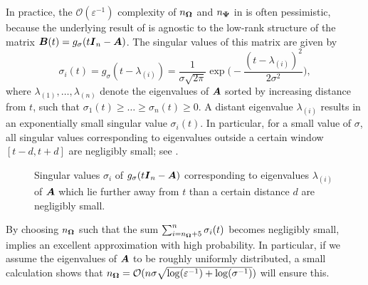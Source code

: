 In practice, the $\mathcal{O}(\varepsilon^{-1})$ complexity of $n_{\boldsymbol{\Omega}}$ and $n_{\boldsymbol{\Psi}}$ in  is often pessimistic, because  the underlying result of  is agnostic to the low-rank structure of the matrix $\boldsymbol{B}(t) = g_{\sigma}(t\boldsymbol{I}_n - \boldsymbol{A})$. The singular values of this matrix are given by
\begin{equation*}
    \sigma_i(t) = g_{\sigma}(t - \lambda_{(i)}) = \frac{1}{\sigma\sqrt{2 \pi}} \exp\Big( -\frac{(t - \lambda_{(i)})^2}{2 \sigma^2} \Big),  
    \label{equ:gaussian-kernel-eigenvalues}
\end{equation*}
where $\lambda_{(1)}, \dots, \lambda_{(n)}$ denote the eigenvalues of $\boldsymbol{A}$ sorted by increasing distance from $t$, such that $\sigma_1(t) \geq \dots \geq \sigma_n(t) \ge 0$. A distant eigenvalue $\lambda_{(i)}$ results in an exponentially small singular value $\sigma_i(t)$. In particular, for a small value of $\sigma$, all singular values corresponding to eigenvalues outside a certain window $[t - d, t + d]$ are negligibly small; see .
\begin{figure}[ht]
    \centering
    
    \caption{Singular values $\sigma_i$ of $g_{\sigma}(t\boldsymbol{I}_n - \boldsymbol{A})$ corresponding to eigenvalues $\lambda_{(i)}$ of $\boldsymbol{A}$ which lie further away from $t$ than a certain distance $d$ are negligibly small.}
    \label{fig:numerical-rank}
\end{figure}
By choosing $n_{\boldsymbol{\Omega}}$ such that the sum $\sum_{i=n_{\boldsymbol{\Omega}}+5}^{n} \sigma_i(t)$ becomes negligibly small,   implies an excellent approximation with high probability. In particular, if we assume the eigenvalues of $\boldsymbol{A}$ to be roughly uniformly distributed, a small calculation shows that $n_{\boldsymbol{\Omega}} = \mathcal{O}(n \sigma \sqrt{\log(\varepsilon^{-1}) + \log(\sigma^{-1})})$ will ensure this.

